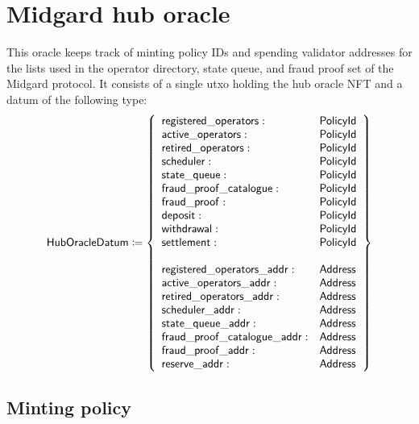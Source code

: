 \documentclass[../midgard.tex]{subfiles}
\begin{document}
\section{Midgard hub oracle}
\label{h:midgard-hub-oracle}

This oracle keeps track of minting policy IDs and spending validator addresses for the lists used in the operator directory, state queue, and fraud proof set of the Midgard protocol.
It consists of a single utxo holding the hub oracle NFT and a datum of the following type:
\begin{equation*}
    \mathsf{HubOracleDatum} \coloneq \left\{
    \begin{array}{ll}
        \mathsf{registered\_operators} : & \mathsf{PolicyId} \\
        \mathsf{active\_operators} : & \mathsf{PolicyId} \\
        \mathsf{retired\_operators} : & \mathsf{PolicyId} \\
        \mathsf{scheduler} : & \mathsf{PolicyId} \\
        \mathsf{state\_queue} : & \mathsf{PolicyId} \\
        \mathsf{fraud\_proof\_catalogue} : & \mathsf{PolicyId} \\
        \mathsf{fraud\_proof} : & \mathsf{PolicyId} \\
        \mathsf{deposit} : & \mathsf{PolicyId} \\
        \mathsf{withdrawal} : & \mathsf{PolicyId} \\
        \mathsf{settlement} : & \mathsf{PolicyId} \\
        \\
        \mathsf{registered\_operators\_addr} : & \mathsf{Address} \\
        \mathsf{active\_operators\_addr} : & \mathsf{Address} \\
        \mathsf{retired\_operators\_addr} : & \mathsf{Address} \\
        \mathsf{scheduler\_addr} : & \mathsf{Address} \\
        \mathsf{state\_queue\_addr} : & \mathsf{Address} \\
        \mathsf{fraud\_proof\_catalogue\_addr} : & \mathsf{Address} \\
        \mathsf{fraud\_proof\_addr} : & \mathsf{Address} \\
        \mathsf{reserve\_addr} : & \mathsf{Address}
    \end{array} \right\}
\end{equation*}

\todo

\subsection{Minting policy}
\label{h:hub-oracle-minting-policy}
\end{document}
